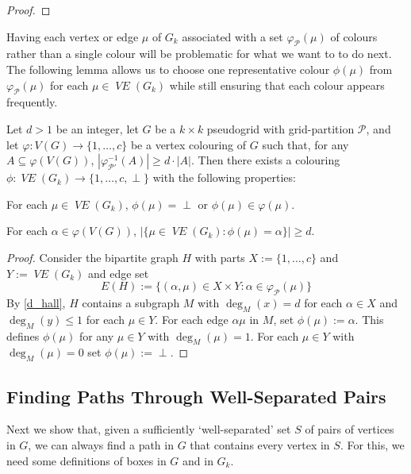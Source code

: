 \documentclass{patmorin}
\DeclareMathOperator{\VE}{\mathit{VE}}
\begin{document}
\begin{proof}
  
\end{proof}

Having each vertex or edge $\mu$ of $G_k$ associated with a set $\varphi_\mathcal{P}(\mu)$ of colours rather than a single colour will be problematic for what we want to to do next.  The following lemma allows us to choose one representative colour $\phi(\mu)$ from $\varphi_{\mathcal{P}}(\mu)$ for each $\mu\in \VE(G_k)$ while still ensuring that each colour appears frequently.

\begin{lem}\label{one_colour_per_object}
  Let $d>1$ be an integer, let $G$ be a $k\times k$ pseudogrid with grid-partition $\mathcal{P}$, and let $\varphi:V(G)\to\{1,\ldots,c\}$ be a vertex colouring of $G$ such that, for any $A\subseteq\varphi(V(G))$, $|\varphi_{\mathcal{P}'}^{-1}(A)| \ge d\cdot|A|$. Then there exists a colouring $\phi:\VE(G_{k})\to\{1,\ldots,c,\perp\}$ with the following properties:
  \begin{compactenum}[(i)]
    \item For each $\mu\in\VE(G_{k})$, $\phi(\mu)=\perp$ or $\phi(\mu)\in\varphi(\mu)$.
    \item For each $\alpha\in\varphi(V(G))$, $|\{\mu\in\VE(G_{k}):\phi(\mu)=\alpha\}|\ge d$.
  \end{compactenum}
\end{lem}

\begin{proof}
  Consider the bipartite graph $H$ with parts $X:=\{1,\ldots,c\}$ and $Y:=\VE(G_k)$ and edge set
  \[
    E(H) := \{ (\alpha,\mu)\in X\times Y: \alpha\in\varphi_\mathcal{P}(\mu) \}
  \]
  By \cref{d_hall}, $H$ contains a subgraph $M$ with $\deg_M(x)=d$ for each $\alpha\in X$ and $\deg_M(y)\le 1$ for each $\mu\in Y$.  For each edge $\alpha\mu$ in $M$, set $\phi(\mu):=\alpha$.  This defines $\phi(\mu)$ for any $\mu\in Y$ with $\deg_M(\mu)=1$.  For each $\mu\in Y$ with $\deg_M(\mu)=0$ set $\phi(\mu):=\perp$.
\end{proof}

\subsection{Finding Paths Through Well-Separated Pairs}
\label{path_finding}

Next we show that, given a sufficiently `well-separated' set $S$ of pairs of vertices in $G$, we can always find a path in $G$ that contains every vertex in $S$. For this, we need some definitions of boxes in $G$ and in $G_k$.
\end{document}
